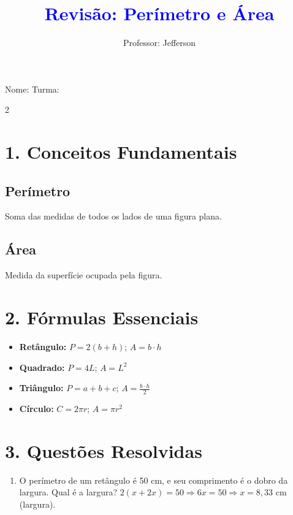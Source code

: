 \documentclass[11pt]{article}
\title{\textcolor{blue}{Revisão: Perímetro e Área}}
\author{Professor: Jefferson}
\date{}
\begin{document}
\maketitle
\vspace{-1cm}

\begin{center}
\large{Nome: \underline{\hspace{8cm}} \quad Turma: \underline{\hspace{3cm}}}
\end{center}

\begin{multicols}{2}

\section*{1. Conceitos Fundamentais}

\subsection*{Perímetro}
Soma das medidas de todos os lados de uma figura plana.

\subsection*{Área}
Medida da superfície ocupada pela figura.

\section*{2. Fórmulas Essenciais}

\begin{itemize}
\item \textbf{Retângulo:} $P = 2(b+h)$; $A = b \cdot h$
\item \textbf{Quadrado:} $P = 4L$; $A = L^2$
\item \textbf{Triângulo:} $P = a+b+c$; $A = \frac{b \cdot h}{2}$
\item \textbf{Círculo:} $C = 2\pi r$; $A = \pi r^2$
\end{itemize}

\section*{3. Questões Resolvidas}

\begin{enumerate}

\item O perímetro de um retângulo é 50 cm, e seu comprimento é o dobro da largura. Qual é a largura?  
{\color{red} $2(x+2x)=50 \Rightarrow 6x=50 \Rightarrow x=8,33$ cm (largura).}


\end{enumerate}
\end{multicols}
\end{document}
